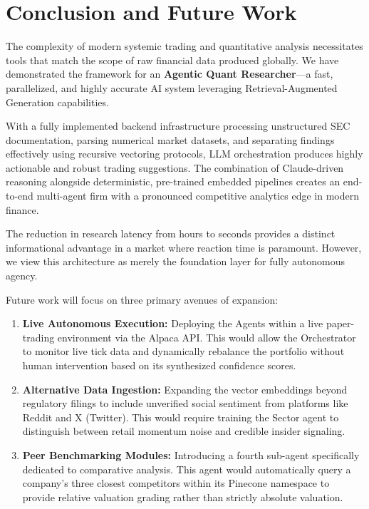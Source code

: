 \section{Conclusion and Future Work}

The complexity of modern systemic trading and quantitative analysis necessitates tools that match the scope of raw financial data produced globally. We have demonstrated the framework for an \textbf{Agentic Quant Researcher}---a fast, parallelized, and highly accurate AI system leveraging Retrieval-Augmented Generation capabilities.

With a fully implemented backend infrastructure processing unstructured SEC documentation, parsing numerical market datasets, and separating findings effectively using recursive vectoring protocols, LLM orchestration produces highly actionable and robust trading suggestions. The combination of Claude-driven reasoning alongside deterministic, pre-trained embedded pipelines creates an end-to-end multi-agent firm with a pronounced competitive analytics edge in modern finance.

The reduction in research latency from hours to seconds provides a distinct informational advantage in a market where reaction time is paramount. However, we view this architecture as merely the foundation layer for fully autonomous agency.

Future work will focus on three primary avenues of expansion:
\begin{enumerate}
    \item \textbf{Live Autonomous Execution:} Deploying the Agents within a live paper-trading environment via the Alpaca API. This would allow the Orchestrator to monitor live tick data and dynamically rebalance the portfolio without human intervention based on its synthesized confidence scores.
    \item \textbf{Alternative Data Ingestion:} Expanding the vector embeddings beyond regulatory filings to include unverified social sentiment from platforms like Reddit and X (Twitter). This would require training the Sector agent to distinguish between retail momentum noise and credible insider signaling.
    \item \textbf{Peer Benchmarking Modules:} Introducing a fourth sub-agent specifically dedicated to comparative analysis. This agent would automatically query a company's three closest competitors within its Pinecone namespace to provide relative valuation grading rather than strictly absolute valuation.
\end{enumerate}
